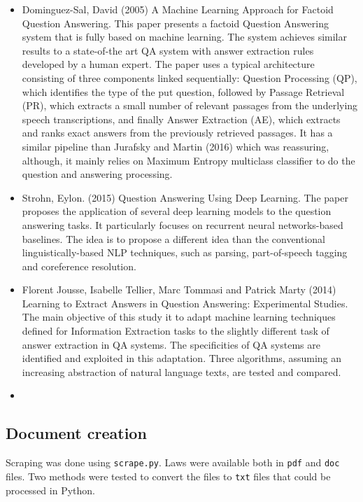 \documentclass[letterpaper, margin=1in]{article}
\begin{document}
\begin{itemize}

\item Dominguez-Sal, David (2005) A Machine Learning Approach for Factoid Question Answering. This paper presents a factoid Question Answering system that is fully based on machine learning. The system achieves similar results to a state-of-the art QA system with answer extraction rules developed by a human expert. The paper uses a typical architecture consisting of three components linked sequentially: Question Processing (QP), which identifies the type of the put question, followed by Passage Retrieval (PR), which extracts a small number of relevant passages from the underlying speech transcriptions, and finally Answer Extraction (AE), which extracts and ranks exact answers from the previously retrieved passages. It has a similar pipeline than Jurafsky and Martin (2016) which was reassuring, although, it mainly relies on Maximum Entropy multiclass classifier to do the question and answering processing.

\item  Strohn, Eylon. (2015) Question Answering Using Deep Learning. The paper proposes the application of several deep learning models to the question answering tasks. It particularly focuses on recurrent neural networks-based baselines. The idea is to propose a different idea than the conventional linguistically-based NLP techniques, such as parsing, part-of-speech tagging and coreference resolution.

\item  Florent Jousse, Isabelle Tellier, Marc Tommasi and Patrick Marty (2014) Learning to Extract Answers in Question Answering: Experimental Studies. The main objective of this study it to adapt machine learning techniques defined for Information Extraction tasks to the slightly different task of answer extraction in QA systems. The specificities of QA systems are identified and exploited in this adaptation. Three algorithms, assuming an increasing abstraction of natural language texts, are tested and compared.

\item 

\end{itemize}


\subsection{Document creation}
Scraping was done using \texttt{scrape.py}. Laws were available both in \texttt{pdf} and \texttt{doc} files. Two methods were tested to convert the files to \texttt{txt} files that could be processed in Python. 
\end{document}
